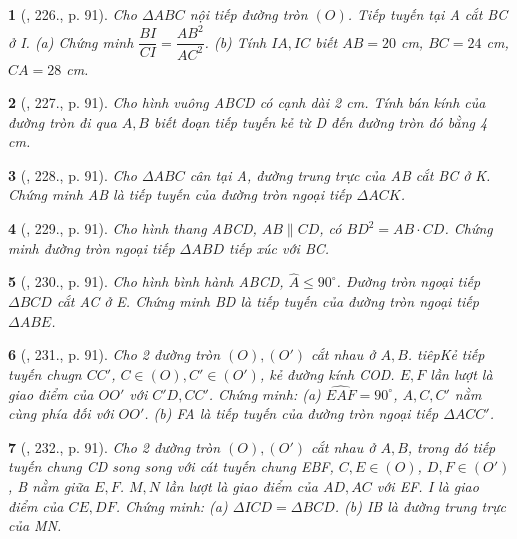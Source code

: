\documentclass{article}
\newtheorem{baitoan}{}
\begin{document}
\begin{baitoan}[\cite{Binh_Toan_9_tap_2}, 226., p. 91]
	Cho $\Delta ABC$ nội tiếp đường tròn $(O)$. Tiếp tuyến tại A cắt BC ở I. (a) Chứng minh $\dfrac{BI}{CI} = \dfrac{AB^2}{AC^2}$. (b) Tính $IA,IC$ biết $AB = 20$ {\rm cm}, $BC = 24$ {\rm cm}, $CA = 28$ {\rm cm}.
\end{baitoan}

\begin{baitoan}[\cite{Binh_Toan_9_tap_2}, 227., p. 91]
	Cho hình vuông ABCD có cạnh dài {\rm2 cm}. Tính bán kính của đường tròn đi qua $A,B$ biết đoạn tiếp tuyến kẻ từ D đến đường tròn đó bằng {\rm4 cm}.
\end{baitoan}

\begin{baitoan}[\cite{Binh_Toan_9_tap_2}, 228., p. 91]
	Cho $\Delta ABC$ cân tại A, đường trung trực của AB cắt BC ở K. Chứng minh AB là tiếp tuyến của đường tròn ngoại tiếp $\Delta ACK$.
\end{baitoan}

\begin{baitoan}[\cite{Binh_Toan_9_tap_2}, 229., p. 91]
	Cho hình thang ABCD, $AB\parallel CD$, có $BD^2 = AB\cdot CD$. Chứng minh đường tròn ngoại tiếp $\Delta ABD$ tiếp xúc với BC.
\end{baitoan}

\begin{baitoan}[\cite{Binh_Toan_9_tap_2}, 230., p. 91]
	Cho hình bình hành ABCD, $\widehat{A}\le90^\circ$. Đường tròn ngoại tiếp $\Delta BCD$ cắt AC ở E. Chứng minh BD là tiếp tuyến của đường tròn ngoại tiếp $\Delta ABE$.
\end{baitoan}

\begin{baitoan}[\cite{Binh_Toan_9_tap_2}, 231., p. 91]
	Cho 2 đường tròn $(O),(O')$ cắt nhau ở $A,B$. tiêpKẻ tiếp tuyến chugn $CC'$, $C\in(O),C'\in(O')$, kẻ đường kính COD. $E,F$ lần lượt là giao điểm của $OO'$ với $C'D,CC'$. Chứng minh: (a) $\widehat{EAF} = 90^\circ$, $A,C,C'$ nằm cùng phía đối với $OO'$. (b) FA là tiếp tuyến của đường tròn ngoại tiếp $\Delta ACC'$.
\end{baitoan}

\begin{baitoan}[\cite{Binh_Toan_9_tap_2}, 232., p. 91]
	Cho 2 đường tròn $(O),(O')$ cắt nhau ở $A,B$, trong đó tiếp tuyến chung CD song song với cát tuyến chung EBF, $C,E\in(O)$, $D,F\in(O')$, B nằm giữa $E,F$. $M,N$ lần lượt là giao điểm của $AD,AC$ với EF. I là giao điểm của $CE,DF$. Chứng minh: (a) $\Delta ICD = \Delta BCD$. (b) IB là đường trung trực của MN.
\end{baitoan}
\end{document}
